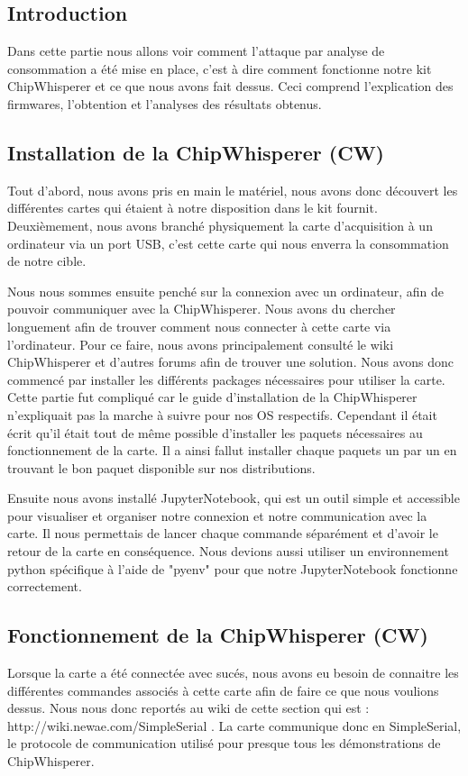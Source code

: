 \subsection{Introduction}
Dans cette partie nous allons voir comment l'attaque par analyse de consommation a été mise en place, c'est à dire comment fonctionne notre kit ChipWhisperer et ce que nous avons fait dessus. Ceci comprend l'explication des firmwares, l'obtention et l'analyses des résultats obtenus.

\subsection{Installation de la ChipWhisperer (CW)}
Tout d'abord, nous avons pris en main le matériel, nous avons donc découvert les différentes cartes qui étaient à notre disposition dans le kit fournit.
Deuxièmement, nous avons branché physiquement la carte d'acquisition à un ordinateur via un port USB, c'est cette carte qui nous enverra la consommation de notre cible.

Nous nous sommes ensuite penché sur la connexion avec un ordinateur, afin de pouvoir communiquer avec la ChipWhisperer. Nous avons du chercher longuement afin de trouver comment nous connecter à cette carte via l'ordinateur. Pour ce faire, nous avons principalement consulté le wiki ChipWhisperer et d'autres forums afin de trouver une solution. 
Nous avons donc commencé par installer les différents packages nécessaires pour utiliser la carte. Cette partie fut compliqué car le guide d'installation de la ChipWhisperer n'expliquait pas la marche à suivre pour nos OS respectifs. Cependant il était écrit qu'il était tout de même possible d'installer les paquets nécessaires au fonctionnement de la carte. Il a ainsi fallut installer chaque paquets un par un en trouvant le bon paquet disponible sur nos distributions. 

Ensuite nous avons installé JupyterNotebook, qui est un outil simple et accessible pour visualiser et organiser notre connexion et notre communication avec la carte. 
Il nous permettais de lancer chaque commande séparément et d'avoir le retour de la carte en conséquence.
Nous devions aussi utiliser un environnement python spécifique à l'aide de "pyenv" pour que notre JupyterNotebook fonctionne correctement.

\subsection{Fonctionnement de la ChipWhisperer (CW)}
Lorsque la carte a été connectée avec sucés, nous avons eu besoin de connaitre les différentes commandes associés à cette carte afin de faire ce que nous voulions dessus.
Nous nous donc reportés au wiki de cette section qui est : http://wiki.newae.com/SimpleSerial .
La carte communique donc en SimpleSerial, le protocole de communication utilisé pour presque tous les démonstrations de ChipWhisperer.

